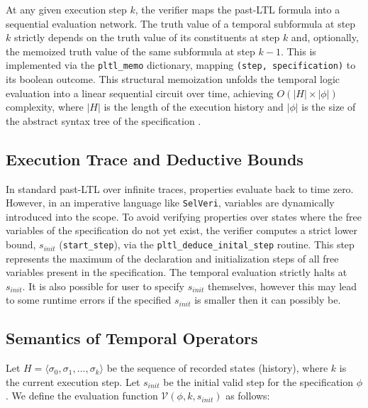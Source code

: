 \documentclass{article}
\begin{document}
At any given execution step $k$, the verifier maps the past-LTL formula into a sequential evaluation network. The truth value of a temporal subformula at step $k$ strictly depends on the truth value of its constituents at step $k$ and, optionally, the memoized truth value of the same subformula at step $k-1$. This is implemented via the \texttt{pltl\_memo} dictionary, mapping \texttt{(step, specification)} to its boolean outcome. This structural memoization unfolds the temporal logic evaluation into a linear sequential circuit over time, achieving $O(|H| \times |\phi|)$ complexity, where $|H|$ is the length of the execution history and $|\phi|$ is the size of the abstract syntax tree of the specification \cite{havelund2004monitoring}.

\subsection{Execution Trace and Deductive Bounds}
In standard past-LTL over infinite traces, properties evaluate back to time zero. However, in an imperative language like \texttt{SelVeri}, variables are dynamically introduced into the scope. To avoid verifying properties over states where the free variables of the specification do not yet exist, the verifier computes a strict lower bound, $s_{init}$ (\texttt{start\_step}), via the \texttt{pltl\_deduce\_inital\_step} routine. This step represents the maximum of the declaration and initialization steps of all free variables present in the specification. The temporal evaluation strictly halts at $s_{init}$. It is also possible for user to specify $s_{init}$ themselves, however this may lead to some runtime errors if the specified $s_{init}$ is smaller then it can possibly be.

\subsection{Semantics of Temporal Operators}
Let $H = \langle \sigma_0, \sigma_1, \dots, \sigma_k \rangle$ be the sequence of recorded states (history), where $k$ is the current execution step. Let $s_{init}$ be the initial valid step for the specification $\phi$. We define the evaluation function $\mathcal{V}(\phi, k, s_{init})$ as follows:
\end{document}

